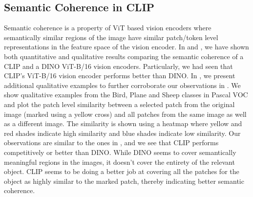 \documentclass[10pt,twocolumn,letterpaper]{article}
\begin{document}
\subsection{Semantic Coherence in CLIP}
\label{app:semantic_coherence}

Semantic coherence is a property of ViT based vision encoders where semantically similar regions of the image have similar patch/token level representations in the feature space of the vision encoder. In  and , we have shown both quantitative and qualitative results comparing the semantic coherence of a CLIP and a DINO ViT-B/16 vision encoders. Particularly, we had seen that CLIP's ViT-B/16 vision encoder performs better than DINO. In , we present additional qualitative examples to further corroborate our observations in . We show qualitative examples from the Bird, Plane and Sheep classes in Pascal VOC and plot the patch level similarity between a selected patch from the original image (marked using a yellow cross) and all patches from the same image as well as a different image. The similarity is shown using a heatmap where yellow and red shades indicate high similarity and blue shades indicate low similarity. Our observations are similar to the ones in , and we see that CLIP performs competitively or better than DINO. While DINO seems to cover semantically meaningful regions in the images, it doesn't cover the entirety of the relevant object. CLIP seems to be doing a better job at covering all the patches for the object as highly similar to the marked patch, thereby indicating better semantic coherence.
\end{document}
